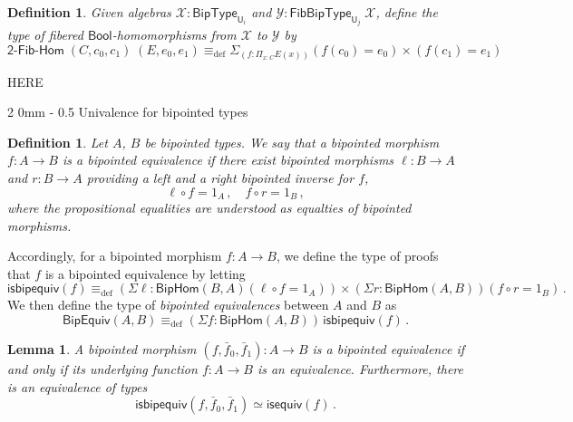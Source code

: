 \documentclass[reqno,10pt,a4paper,oneside]{amsart}
\makeatletter
\numberwithin{equation}{section}
\renewcommand{\subsection}{\@startsection
  {subsection}%
  {2}%
  {0mm}%
  {-\baselineskip}%
  {0.5\baselineskip}%
  {\normalfont\normalsize\bf}}%
\theoremstyle{mythm}
\newtheorem{lemma}[theorem]{Lemma}
\theoremstyle{mydef}
\newtheorem{definition}[theorem]{Definition}
\theoremstyle{myrmk}
\newcommand{\ie}{\text{i.e.\ }}
\newcommand{\myemph}[1]{\textit{#1}}
\newcommand{\deq}{\equiv}
\newcommand{\defeq}{\deq_{\mathrm{def}}}
\newcommand{\co}{\colon}
\newcommand{\prd}[1]{\Pi_{#1}}
\newcommand{\sm}[1]{\Sigma_{#1}}
\newcommand{\Bool}{\mathsf{Bool}}
\newcommand{\UU}{\mathsf{U}}
\newcommand{\BoolAlg}{\mathsf{BipType}}
\newcommand{\BoolFibAlg}{\mathsf{FibBipType}}
\newcommand{\BoolFibHom}{\mathsf{2}\text{-}\mathsf{Fib}\text{-}\mathsf{Hom}}
\newcommand{\X}{\mathcal{X}}
\newcommand{\Y}{\mathcal{Y}}
\makeatother
\begin{document}
\begin{definition}\label{def:BoolFibHom}
Given algebras $\X : \BoolAlg_{\UU_i}$ and $\Y : \BoolFibAlg_{\UU_j} \; \X$, define the type of \emph{fibered $\Bool$-homomorphisms} from $\X$ to $\Y$ by
\[\BoolFibHom \; (C,c_0,c_1) \; (E,e_0,e_1) \defeq \sm{(f:\prd{x:C} E(x))} (f(c_0) = e_0) \times (f(c_1) = e_1) \]
\end{definition}
\vspace{3cm}


HERE

\subsection{Univalence for bipointed types} 




\begin{definition} Let $A$, $B$ be bipointed types. We say that a bipointed morphism $f \co A \to B$ is a \myemph{bipointed equivalence}
if there exist bipointed morphisms $\ell \co B \to A$ and $r \co B \to A$ providing a left and a right bipointed inverse for $f$, \ie 
\[ 
\ell \circ f = 1_A \, , \quad f \circ r = 1_B \, ,
\]
where the propositional equalities are understood as equalties of bipointed morphisms.
\end{definition}


Accordingly, for a bipointed morphism $f \co A \to B$, we define the type of proofs that $f$ is a bipointed equivalence by letting
\[
\mathsf{isbipequiv}(f) \defeq   ( \Sigma \ell : \mathsf{BipHom}(B,A) ( \ell \circ f = 1_A )) \times 
    (\Sigma r : \mathsf{BipHom}(A, B))(  f \circ r = 1_B ) \, .
\]
We then define the type of \emph{bipointed equivalences} between $A$ and $B$ as
\[
\mathsf{BipEquiv}(A, B)
\defeq    (\Sigma f : \mathsf{BipHom}(A,B)) \, \mathsf{isbipequiv}(f)  \, . 
\] 


\begin{lemma}\label{BoolAlgSpace} A bipointed morphism $(f, \bar{f}_0, \bar{f}_1) \co A \to B$ is a bipointed equivalence if and only
if its underlying function $f \co A \to B$ is an equivalence. Furthermore, there is an equivalence of types
\[
\mathsf{isbipequiv}(f, \bar{f}_0, \bar{f}_1)  \simeq \mathsf{isequiv}(f) \, . 
\]
\end{lemma}  
\end{document}

